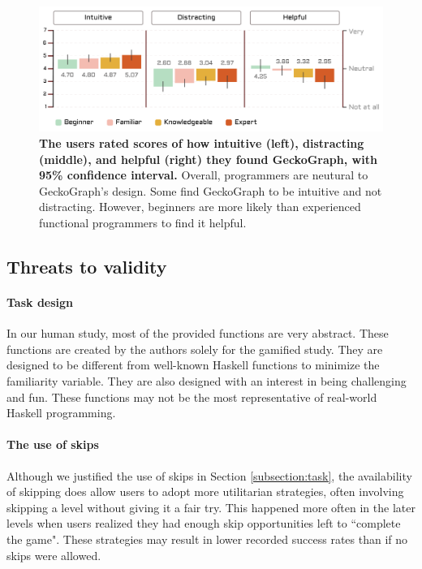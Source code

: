 \documentclass[preprint,12pt]{elsarticle}
\begin{document}

\begin{figure}[]
  \includegraphics[width=\linewidth]{figures/Qualitative}
  \caption{\label{fig:qualitative} {\bf The users rated scores of how intuitive (left), distracting (middle), and helpful (right) they found GeckoGraph, with 95\% confidence interval.} Overall, programmers are neutural to GeckoGraph's design. Some find GeckoGraph to be intuitive and not distracting. However, beginners are more likely than experienced functional programmers to find it helpful. }
\end{figure}

\subsection{Threats to validity}

\paragraph{Task design}
In our human study, most of the provided functions are very abstract. These functions are created by the authors solely for the gamified study. They are designed to be different from well-known Haskell functions to minimize the familiarity variable. They are also designed with an interest in being challenging and fun. These functions may not be the most representative of real-world Haskell programming. 

\paragraph{The use of skips}
Although we justified the use of skips in Section \ref{subsection:task}, the availability of skipping does allow users to adopt more utilitarian strategies, often involving skipping a level without giving it a fair try. This happened more often in the later levels when users realized they had enough skip opportunities left to ``complete the game". These strategies may result in lower recorded success rates than if no skips were allowed.
\end{document}
